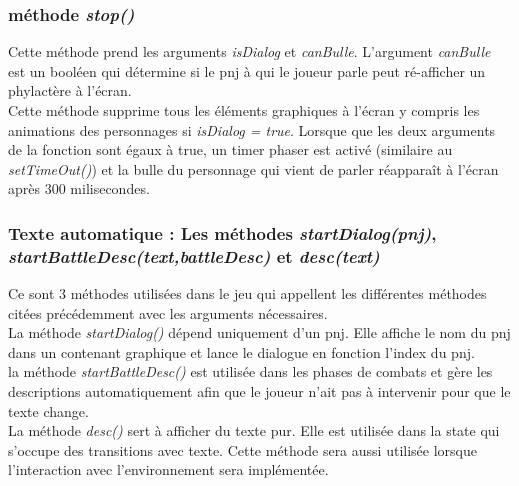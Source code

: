 \documentclass[11pt]{article}
\begin{document}
\subsubsection{méthode \textit{stop()}}
Cette méthode prend les arguments \textit{isDialog} et \textit{canBulle}. L'argument \textit{canBulle} est un booléen qui détermine si le pnj à qui le joueur parle peut ré-afficher un phylactère à l'écran.\\

Cette méthode supprime tous les éléments graphiques à l'écran y compris les animations des personnages si \textit{isDialog = true}.  Lorsque que les deux arguments de la fonction sont égaux à true, un timer phaser est activé (similaire au \textit{setTimeOut()}) et la bulle du personnage qui vient de parler réapparaît à l'écran après 300 milisecondes. 

\subsubsection{Texte automatique : Les méthodes \textit{startDialog(pnj)}, \textit{startBattleDesc(text,battleDesc)} et \textit{desc(text)}}
Ce sont 3 méthodes utilisées dans le jeu qui appellent les différentes méthodes citées précédemment avec les arguments nécessaires. \\

La méthode \textit{startDialog()} dépend uniquement d'un pnj. Elle affiche le nom du pnj dans un contenant graphique et lance le dialogue en fonction l'index du pnj. \\

la méthode \textit{startBattleDesc()} est utilisée dans les phases de combats et gère les descriptions automatiquement afin que le joueur n'ait pas à intervenir pour que le texte change. \\

La méthode \textit{desc()} sert à afficher du texte pur.  Elle est utilisée dans la state qui s'occupe des transitions avec texte. Cette méthode sera aussi utilisée lorsque l'interaction avec l'environnement sera implémentée.\\
\end{document}
